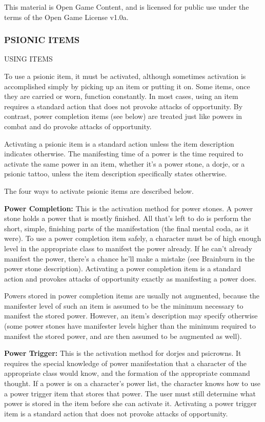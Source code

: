 \documentclass{article}
\begin{document}
This material is Open Game Content, and is licensed for public use under the terms 
of the Open Game License v1.0a.

\subsubsection*{{\LARGE{}PSIONIC ITEMS}}

\vspace{12pt}
USING ITEMS

To use a psionic item, it must be activated, although sometimes activation is accomplished 
simply by picking up an item or putting it on. Some items, once they are carried 
or worn, function constantly. In most cases, using an item requires a standard 
action that does not provoke attacks of opportunity. By contrast, power completion 
items (see below) are treated just like powers in combat and do provoke attacks 
of opportunity.

Activating a psionic item is a standard action unless the item description indicates 
otherwise. The manifesting time of a power is the time required to activate the 
same power in an item, whether it's a power stone, a dorje, or a psionic tattoo, 
unless the item description specifically states otherwise.

The four ways to activate psionic items are described below.

\textbf{Power Completion:} This is the activation method for power stones. A power 
stone holds a power that is mostly finished. All that's left to do is perform the 
short, simple, finishing parts of the manifestation (the final mental coda, as 
it were). To use a power completion item safely, a character must be of high enough 
level in the appropriate class to manifest the power already. If he can't already 
manifest the power, there's a chance he'll make a mistake (see Brainburn in the 
power stone description). Activating a power completion item is a standard action 
and provokes attacks of opportunity exactly as manifesting a power does.

Powers stored in power completion items are usually not augmented, because the 
manifester level of such an item is assumed to be the minimum necessary to manifest 
the stored power. However, an item's description may specify otherwise (some power 
stones have manifester levels higher than the minimum required to manifest the 
stored power, and are then assumed to be augmented as well).

\textbf{Power Trigger:} This is the activation method for dorjes and psicrowns. 
It requires the special knowledge of power manifestation that a character of the 
appropriate class would know, and the formation of the appropriate command thought. 
If a power is on a character's power list, the character knows how to use a power 
trigger item that stores that power. The user must still determine what power is 
stored in the item before she can activate it. Activating a power trigger item 
is a standard action that does not provoke attacks of opportunity.
\end{document}
